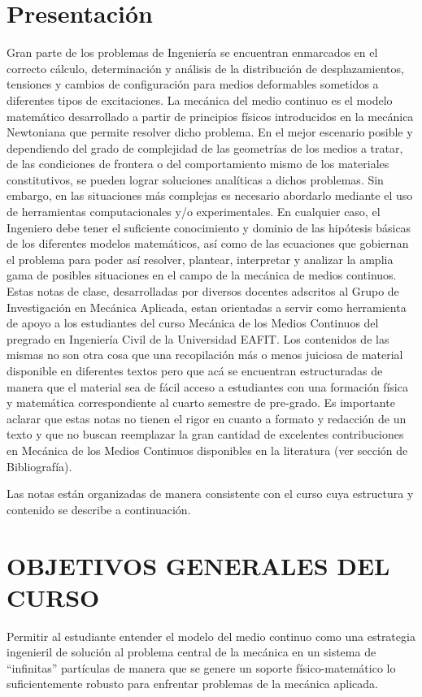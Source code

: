 %
\section*{Presentación}
%
Gran parte de los problemas de Ingeniería se encuentran enmarcados en el correcto cálculo, determinación y análisis de la distribución de desplazamientos, tensiones y cambios de configuración para medios deformables sometidos a diferentes tipos de excitaciones.  La mecánica del medio continuo es el modelo matemático desarrollado a partir de principios físicos introducidos en la mecánica Newtoniana que permite resolver dicho problema.  En el mejor escenario posible y dependiendo del grado de complejidad de las geometrías de los medios a tratar, de las condiciones de frontera o del comportamiento mismo de los materiales constitutivos, se pueden lograr soluciones analíticas a dichos problemas.  Sin embargo, en las situaciones más complejas es necesario abordarlo mediante el uso de herramientas computacionales y/o experimentales.  En cualquier caso, el Ingeniero debe tener el suficiente conocimiento y dominio de las hipótesis básicas de los diferentes modelos matemáticos, así como de las ecuaciones que gobiernan el problema para poder así resolver, plantear, interpretar y analizar la amplia gama de posibles situaciones en el campo de la mecánica de medios continuos.
%
Estas notas de clase, desarrolladas por diversos docentes adscritos al Grupo de Investigación en Mecánica Aplicada, estan orientadas a servir como herramienta de apoyo a los estudiantes del curso Mecánica de los Medios Continuos del pregrado en Ingeniería Civil de la Universidad EAFIT. Los contenidos de las mismas no son otra cosa que una recopilación más o menos juiciosa de material disponible en diferentes textos pero que acá se encuentran estructuradas de manera que el material sea de fácil acceso a estudiantes con una formación física y matemática correspondiente al cuarto semestre de pre-grado. Es importante aclarar que estas notas no tienen el rigor en cuanto a formato y redacción de un texto y que no buscan reemplazar la gran cantidad de excelentes contribuciones en Mecánica de los Medios Continuos disponibles en la literatura (ver sección de Bibliografía).

Las notas están organizadas de manera consistente con el curso cuya estructura y contenido se describe a continuación. 
%
\section*{OBJETIVOS GENERALES DEL CURSO}
%
Permitir al estudiante entender el modelo del medio continuo como una estrategia ingenieril de solución al problema central de la mecánica en un sistema de “infinitas” partículas de manera que se genere un soporte físico-matemático lo suficientemente robusto para enfrentar problemas de la mecánica aplicada.
%
%
